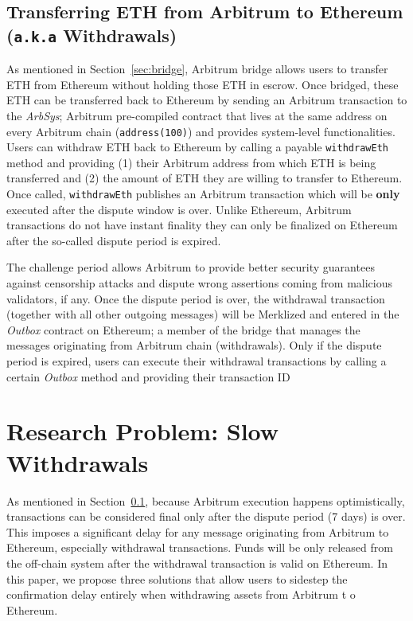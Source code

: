 \subsection{Transferring ETH from Arbitrum to Ethereum (\texttt{a.k.a} Withdrawals)} \label{sec:withdraw}

As mentioned in Section~\ref{sec:bridge}, Arbitrum bridge allows users to transfer ETH from Ethereum without holding those ETH in escrow. Once bridged, these ETH can be transferred back to Ethereum by sending an Arbitrum transaction to the \textit{ArbSys}; Arbitrum pre-compiled contract that lives at the same address on every Arbitrum chain (\texttt{address(100)}) and provides system-level functionalities. Users can withdraw ETH back to Ethereum by calling a payable \texttt{withdrawEth} method and providing (1) their Arbitrum address from which ETH is being transferred and (2) the amount of ETH they are willing to transfer to Ethereum. Once called, \texttt{withdrawEth} publishes an Arbitrum transaction which will be \textbf{only} executed after the dispute window is over. Unlike Ethereum, Arbitrum transactions do not have instant finality \ie they can only be finalized on Ethereum after the so-called dispute period is expired. 

The challenge period allows Arbitrum to provide better security guarantees against censorship attacks and dispute wrong assertions coming from malicious validators, if any. Once the dispute period is over, the withdrawal transaction (together with all other outgoing messages) will be Merklized and entered in the \textit{Outbox} contract on Ethereum; a member of the bridge that manages the messages originating from Arbitrum chain (\eg withdrawals). Only if the dispute period is expired, users can execute their withdrawal transactions by calling a certain \textit{Outbox} method and providing their transaction ID


\section{Research Problem: Slow Withdrawals}
As mentioned in Section~\ref{sec:withdraw}, because Arbitrum execution happens optimistically, transactions can be considered final only after the dispute period (7 days) is over. This imposes a significant delay for any message originating from Arbitrum to Ethereum, especially withdrawal transactions. Funds will be only released from the off-chain system after the withdrawal transaction is valid on Ethereum. In this paper, we propose three solutions that allow users to sidestep the confirmation delay entirely when withdrawing assets from Arbitrum t o Ethereum. 


